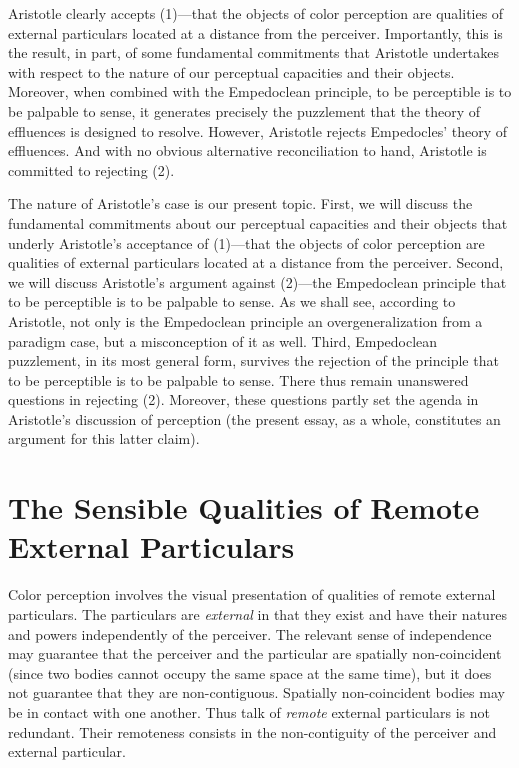 Aristotle clearly accepts (1)---that the objects of color perception are qualities of external particulars located at a distance from the perceiver. Importantly, this is the result, in part, of some fundamental commitments that Aristotle undertakes with respect to the nature of our perceptual capacities and their objects. Moreover, when combined with the Empedoclean principle, to be perceptible is to be palpable to sense, it generates precisely the puzzlement that the theory of effluences is designed to resolve. However, Aristotle rejects Empedocles' theory of effluences. And with no obvious alternative reconciliation to hand, Aristotle is committed to rejecting (2). 

The nature of Aristotle's case is our present topic. First, we will discuss the fundamental commitments about our perceptual capacities and their objects that underly Aristotle's acceptance of (1)---that the objects of color perception are qualities of external particulars located at a distance from the perceiver. Second, we will discuss Aristotle's argument against (2)---the Empedoclean principle that to be perceptible is to be palpable to sense. As we shall see, according to Aristotle, not only is the Empedoclean principle an overgeneralization from a paradigm case, but a misconception of it as well. Third, Empedoclean puzzlement, in its most general form, survives the rejection of the principle that to be perceptible is to be palpable to sense. There thus remain unanswered questions in rejecting (2). Moreover, these questions partly set the agenda in Aristotle's discussion of perception (the present essay, as a whole, constitutes an argument for this latter claim). 

\section{The Sensible Qualities of Remote External Particulars} %
\label{sec:sensible_qualities_of_remote_external_particulars}

Color perception involves the visual presentation of qualities of remote external particulars. The particulars are \emph{external} in that they exist and have their natures and powers independently of the perceiver. The relevant sense of independence may guarantee that the perceiver and the particular are spatially non-coincident (since two bodies cannot occupy the same space at the same time), but it does not guarantee that they are non-contiguous. Spatially non-coincident bodies may be in contact with one another. Thus talk of \emph{remote} external particulars is not redundant. Their remoteness consists in the non-contiguity of the perceiver and external particular.

